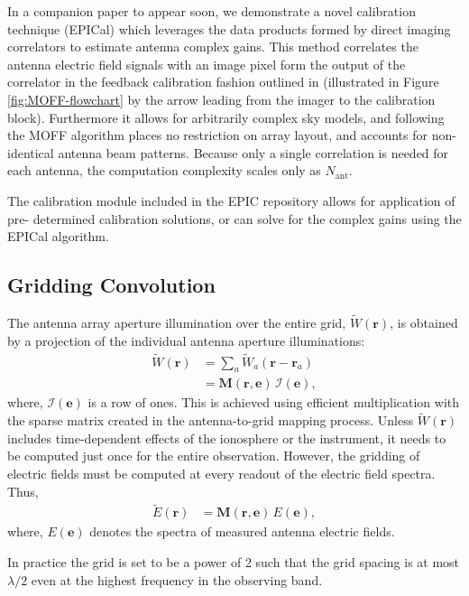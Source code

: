 \documentclass[a4paper,fleqn,usenatbib]{../mnras}
\begin{document}
In a companion paper to appear soon, we demonstrate a novel calibration 
technique (EPICal) which leverages the data products formed by direct imaging 
correlators to estimate antenna complex gains. This method correlates the antenna 
electric field signals with an image pixel form the output of the correlator in the 
feedback calibration fashion outlined in \citealt{mor11} (illustrated in Figure 
\ref{fig:MOFF-flowchart} by the arrow leading from the imager to the calibration 
block). Furthermore it allows for arbitrarily complex sky models, and following the 
MOFF algorithm places no restriction on array layout, and accounts for non-identical 
antenna beam patterns. Because only a single correlation is needed for each 
antenna, the computation complexity scales only as $N_{\mathrm{ant}}$. 

The calibration module included in the EPIC repository allows for application of pre-
determined calibration solutions, or can solve for the complex gains using the 
EPICal algorithm.

\subsection{Gridding Convolution}

The antenna array aperture illumination over the entire grid,
$\widetilde{W}(\mathbf{r})$, is obtained by a projection of the individual
antenna aperture illuminations:
\begin{align}\label{eqn:gridding-convolution}
  \widetilde{W}(\mathbf{r}) &= \sum_a \widetilde{W}_a(\mathbf{r}-\mathbf{r}_a) \\
                            &= \mathbf{M}(\mathbf{r},\mathbf{e})\,\mathcal{I}(\mathbf{e}),
\end{align}
where, $\mathcal{I}(\mathbf{e})$ is a row of ones. This is achieved using
efficient multiplication with the sparse matrix created in the antenna-to-grid
mapping process. Unless $\widetilde{W}(\mathbf{r})$ includes time-dependent
effects of the ionosphere or the instrument, it needs to be computed just once
for the entire observation. However, the gridding of electric fields must be
computed at every readout of the electric field spectra. Thus,
\begin{align}
  \widetilde{E}(\mathbf{r}) &= \mathbf{M}(\mathbf{r},\mathbf{e})\,E(\mathbf{e}),
\end{align}
where, $E(\mathbf{e})$ denotes the spectra of measured antenna electric fields.

In practice the grid is set to be a power of 2 such that the grid spacing is at
most $\lambda/2$ even at the highest frequency in the observing band. 
\end{document}
